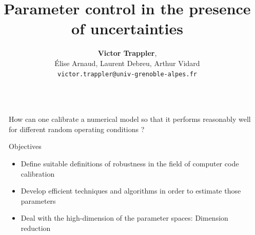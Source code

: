 \message{ !name(beamer_poster_2col.tex)}\documentclass{beamer}
\title{Parameter control in the presence of uncertainties}
\author{ \textbf{Victor Trappler},\\ {\Large Élise Arnaud, Laurent Debreu, Arthur Vidard} \\[.5ex]
  {\large \texttt{victor.trappler@univ-grenoble-alpes.fr}}}
\institute{\large AIRSEA Research team (Inria) -- Laboratoire Jean Kuntzmann \\[2ex]
\textsc{$7^{\mathrm{th}}$ PHD Day, ED MSTII, Grenoble 2018} }
\date{}
\newlength{\leftmar}
\newlength{\centercol}
\begin{document}

\begin{frame}[t]
  \begin{columns}[t]
    \begin{column}{\leftmar}\end{column}
    \begin{column}{\centercol}

      
            {\Large How can one calibrate a numerical model so that it performs reasonably well for different random operating conditions ?
}
     \large       
    \begin{alertblock}{Objectives}

    \begin{itemize}
    \item Define suitable \alert{definitions of robustness} in the field of computer code calibration
    \item Develop \alert{efficient} techniques and algorithms in order to estimate those parameters
    \item Deal with the high-dimension of the parameter spaces: \alert{Dimension reduction }
    \end{itemize}
  \end{alertblock}
\end{column}
\end{columns}
\vspace{0.2in}
\begin{columns}[t] %

\begin{column}{\leftmar}\end{column} %


\end{columns}
\end{frame}
\end{document}
